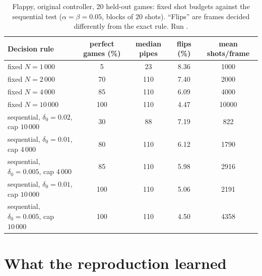\begin{table}[t]
\caption{Flappy, original controller, 20 held-out games: fixed shot budgets against the
sequential test ($\alpha=\beta=0.05$, blocks of 20 shots).  ``Flips'' are frames decided
differently from the exact rule.  Run .}
\label{tab:agentic-sprt}
\begin{tabular}{@{}l S[table-format=3.0] S[table-format=3.0] S[table-format=2.2] S[table-format=5.0]@{}}
\toprule
Decision rule & {perfect games (\%)} & {median pipes} & {flips (\%)} & {mean shots/frame} \\
\midrule
fixed $N = 1\,000$ & 5 & 23 & 8.36 & 1000 \\
fixed $N = 2\,000$ & 70 & 110 & 7.40 & 2000 \\
fixed $N = 4\,000$ & 85 & 110 & 6.09 & 4000 \\
fixed $N = 10\,000$ & 100 & 110 & 4.47 & 10000 \\
sequential, $\delta_0 = 0.02$, cap $10\,000$ & 30 & 88 & 7.19 & 822 \\
sequential, $\delta_0 = 0.01$, cap $4\,000$ & 80 & 110 & 6.12 & 1790 \\
sequential, $\delta_0 = 0.005$, cap $4\,000$ & 85 & 110 & 5.98 & 2916 \\
sequential, $\delta_0 = 0.01$, cap $10\,000$ & 100 & 110 & 5.06 & 2191 \\
sequential, $\delta_0 = 0.005$, cap $10\,000$ & 100 & 110 & 4.50 & 4358 \\
\bottomrule
\end{tabular}
\end{table}


\section{What the reproduction learned}
\label{app:learnings}

